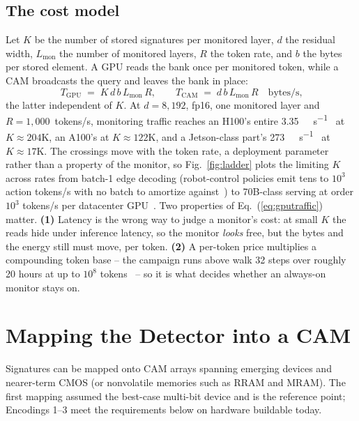 \documentclass[conference]{IEEEtran}
\newcommand{\cam}{{CAM}\xspace}
\begin{document}
\subsection{The cost model}
\label{sec:Scaling}
\label{subsec:CostModel}
\label{subsec:Ladder}
Let $K$ be the number of stored signatures per monitored layer, $d$
the residual width, $L_{\mathrm{mon}}$ the number of monitored
layers, $R$ the token rate, and $b$ the bytes per stored element. A
GPU reads the bank once per monitored token, while a \cam broadcasts
the query and leaves the bank in place:
%
\begin{equation}
T_{\mathrm{GPU}} \;=\; K \, d \, b \, L_{\mathrm{mon}} \, R, \qquad
T_{\mathrm{CAM}} \;=\; d \, b \, L_{\mathrm{mon}} \, R
\quad\text{bytes/s,}
\label{eq:gputraffic}
\end{equation}
%
the latter independent of $K$. At $d=8{,}192$, fp16, one monitored
layer and $R=1{,}000$~tokens/s, monitoring traffic reaches an H100's
entire \qty{3.35}{\tera\byte\per\second}~\cite{nvidia_h100} at
$K\!\approx\!204$K, an A100's at $K\!\approx\!122$K, and a
Jetson-class part's
\qty{273}{\giga\byte\per\second}~\cite{nvidia_thor} at
$K\!\approx\!17$K. The crossings move with the token rate, a
deployment parameter rather than a property of the monitor, so
Fig.~\ref{fig:ladder} plots the limiting $K$ across rates from
batch-1 edge decoding (robot-control policies emit tens to $10^{3}$
action tokens/s with no batch to amortize
against~\cite{vlaperf2026}) to 70B-class serving at order $10^{3}$
tokens/s per datacenter GPU~\cite{lyceum2026tps}. Two properties of
Eq.~(\ref{eq:gputraffic}) matter. {\bf (1)} Latency is the wrong
way to judge a monitor's cost: at small $K$ the reads hide under
inference latency, so the monitor \emph{looks} free, but the bytes
and the energy still must move, per token. {\bf (2)} A per-token
price multiplies a compounding token base -- the campaign runs above
walk 32 steps over roughly 20 hours at up to $10^{8}$
tokens~\cite{aisi2026cyber} -- so it is what decides whether an
always-on monitor stays on.

\section{Mapping the Detector into a CAM}
\label{sec:Mapping}
Signatures can be mapped onto \cam arrays spanning emerging devices
and nearer-term CMOS (or nonvolatile memories such as RRAM and MRAM).
The first mapping assumed the best-case multi-bit device and is the
reference point; Encodings 1--3 meet the requirements below on
hardware buildable today.
\end{document}
